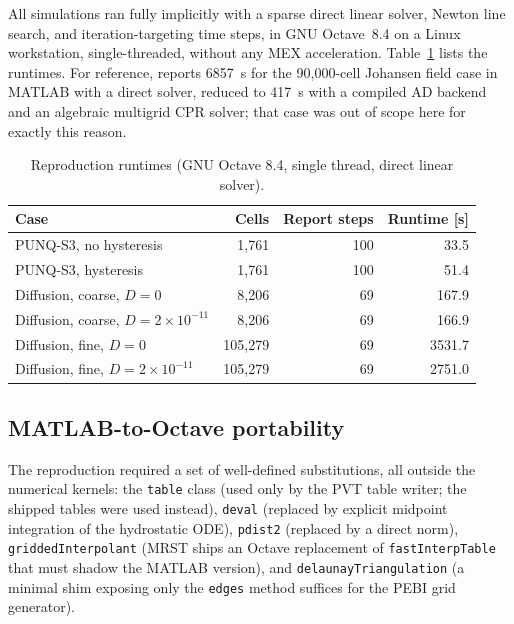 \documentclass[preprint,11pt]{elsarticle}
\begin{document}
All simulations ran fully implicitly with a sparse direct linear solver,
Newton line search, and iteration-targeting time steps, in GNU
Octave~8.4 on a Linux workstation, single-threaded, without any MEX
acceleration. Table~\ref{tab:runtimes} lists the runtimes. For
reference, \cite{salo2024} reports \SI{6857}{s} for the 90{,}000-cell
Johansen field case in MATLAB with a direct solver, reduced to
\SI{417}{s} with a compiled AD backend and an algebraic multigrid CPR
solver; that case was out of scope here for exactly this reason.

\begin{table}[tb]
\centering
\caption{Reproduction runtimes (GNU Octave 8.4, single thread,
direct linear solver).}
\label{tab:runtimes}
\begin{tabular}{lrrr}
\toprule
Case & Cells & Report steps & Runtime [s] \\
\midrule
PUNQ-S3, no hysteresis      & 1{,}761   & 100 & 33.5 \\
PUNQ-S3, hysteresis         & 1{,}761   & 100 & 51.4 \\
Diffusion, coarse, $D{=}0$    & 8{,}206   & 69  & 167.9 \\
Diffusion, coarse, $D{=}2\times10^{-11}$ & 8{,}206 & 69 & 166.9 \\
Diffusion, fine, $D{=}0$      & 105{,}279 & 69 & 3531.7 \\
Diffusion, fine, $D{=}2\times10^{-11}$   & 105{,}279 & 69 & 2751.0 \\
\bottomrule
\end{tabular}
\end{table}

\subsection{MATLAB-to-Octave portability}

The reproduction required a set of well-defined substitutions, all
outside the numerical kernels: the \texttt{table} class (used only by
the PVT table writer; the shipped tables were used instead),
\texttt{deval} (replaced by explicit midpoint integration of the
hydrostatic ODE), \texttt{pdist2} (replaced by a direct norm),
\texttt{griddedInterpolant} (MRST ships an Octave replacement of
\texttt{fastInterpTable} that must shadow the MATLAB version), and
\texttt{delaunayTriangulation} (a minimal shim exposing only the
\texttt{edges} method suffices for the PEBI grid generator).
\end{document}
